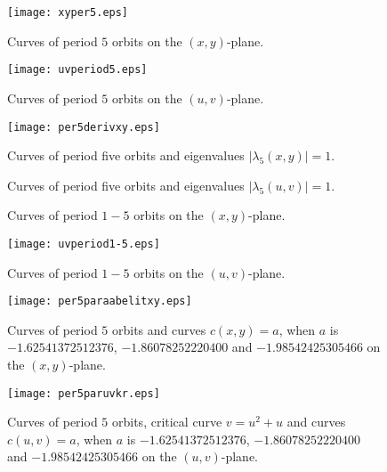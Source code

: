 \documentclass[12pt,a4paper]{amsart}
\numberwithin{equation}{section}
\numberwithin{lause}{section}
\begin{document}
\clearpage

\clearpage
\begin{figure}[h!]
\begin{center}
\texttt{[image: xyper5.eps]}
\caption{Curves of period $5$ orbits on the $(x,y)$-plane.} \label{kuva13}
\end{center}
\end{figure}
\begin{figure}[h!]
\begin{center}
\texttt{[image: uvperiod5.eps]}
\caption{Curves of period $5$ orbits on the $(u,v)$-plane.} \label{kuva14}
\end{center}
\end{figure}
\clearpage




\clearpage

\begin{figure}[h!]
\begin{center}
\texttt{[image: per5derivxy.eps]}
\caption{Curves of period five orbits and eigenvalues $|\lambda_{5}(x,y)|=1$.}
\label{kuva10.11}
\end{center}
\end{figure}
\begin{figure}[h!]
\begin{center}
\caption{Curves of period five orbits and eigenvalues $|\lambda_{5}(u,v)|=1$.}
\label{kuva10.1}
\end{center}
\end{figure}
\clearpage


\begin{figure}[h!]
\begin{center}
\caption{Curves of period $1-5$ orbits on the $(x,y)$-plane.} \label{kuva16}
\end{center}
\end{figure}
\begin{figure}[h!]
\begin{center}
\texttt{[image: uvperiod1-5.eps]}
\caption{Curves of period $1-5$ orbits on the $(u,v)$-plane.} \label{kuva17}
\end{center}
\end{figure}
\clearpage

\clearpage
\begin{figure}[h!]
\begin{center}
\texttt{[image: per5paraabelitxy.eps]}
\caption{Curves of period $5$ orbits and curves $c(x,y)=a$, when $a$ is $-1.62541372512376$, $-1.86078252220400$ and $-1.98542425305466$ on the $(x,y)$-plane.} \label{kuva130}
\end{center}
\end{figure}
\begin{figure}[h!]
\begin{center}
\texttt{[image: per5paruvkr.eps]}
\caption{Curves of period $5$ orbits, critical curve $v=u^2+u$ and curves $c(u,v)=a$, when $a$ is $-1.62541372512376$, $-1.86078252220400$ and $-1.98542425305466$ on the $(u,v)$-plane.} \label{kuva140}
\end{center}
\end{figure}
\end{document}
